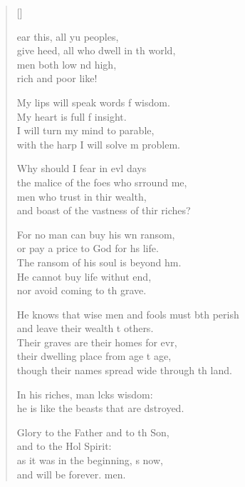 \settowidth{\versewidth}{He knows that wise men and fools must both perish *}
\begin{verse}[\versewidth]
  \begin{patverse}
ear this, all yu peoples,\Med\\
give heed, all who dwell in th world,\\
men both low nd high,\Med\\
rich and poor like!

My lips will speak words f wisdom.\Med\\
My heart is full f insight.\\
I will turn my mind to  parable,\Med\\
with the harp I will solve m problem.

Why should I fear in ev\pointup{\i}l days\Med\\
the malice of the foes who srround me,\\
men who trust in thir wealth,\Med\\
and boast of the vastness of thir riches?

For no man can buy his wn ransom,\Med\\
or pay a price to God for h\pointup{\i}s life.\\
The ransom of his soul is beyond h\pointup{\i}m.\Flex\\
He cannot buy life withut end,\Med\\
nor avoid coming to th grave.

He knows that wise men and fools must bth perish\Med\\
and leave their wealth t others.\\
Their graves are their homes for evr,\Flex\\
their dwelling place from age t age,\Med\\
though their names spread wide through th land.

In his riches, man lcks wisdom:\Med\\
he is like the beasts that are dstroyed.

Glory to the Father and to th Son,\Med\\
and to the Hol Spirit:\\
as it was in the beginning, \pointup{\i}s now,\Med\\
and will be forever. men. 
  \end{patverse}
\end{verse}

